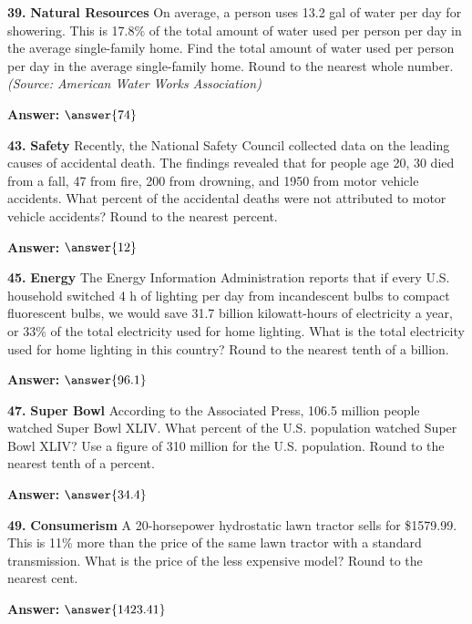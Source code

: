 \documentclass{ximera}
\begin{document}
\begin{problem}
\textbf{39.} \textbf{Natural Resources} On average, a person uses 13.2 gal of water per day
  for showering. This is 17.8\% of the total amount of water used per person per day in
  the average single-family home. Find the total amount of water used per person per
  day in the average single-family home. Round to the nearest whole number.
  \emph{(Source: American Water Works Association)}

\textbf{Answer:} $\answer{74}$
\end{problem}

\begin{problem}
\textbf{43.} \textbf{Safety} Recently, the National Safety Council collected data on the
  leading causes of accidental death. The findings revealed that for people age 20,
  30 died from a fall, 47 from fire, 200 from drowning, and 1950 from motor vehicle
  accidents. What percent of the accidental deaths were not attributed to motor vehicle
  accidents? Round to the nearest percent.

\textbf{Answer:} $\answer{12}$
\end{problem}

\begin{problem}
\textbf{45.} \textbf{Energy} The Energy Information Administration reports that if every U.S.
  household switched 4 h of lighting per day from incandescent bulbs to compact
  fluorescent bulbs, we would save 31.7 billion kilowatt-hours of electricity a year,
  or 33\% of the total electricity used for home lighting. What is the total electricity
  used for home lighting in this country? Round to the nearest tenth of a billion.

\textbf{Answer:} $\answer{96.1}$
\end{problem}

\begin{problem}
\textbf{47.} \textbf{Super Bowl} According to the Associated Press, 106.5 million people
  watched Super Bowl XLIV. What percent of the U.S. population watched Super Bowl XLIV?
  Use a figure of 310 million for the U.S. population. Round to the nearest tenth of a
  percent.

\textbf{Answer:} $\answer{34.4}$
\end{problem}

\begin{problem}
\textbf{49.} \textbf{Consumerism} A 20-horsepower hydrostatic lawn tractor sells for
  \$1579.99. This is 11\% more than the price of the same lawn tractor with a standard
  transmission. What is the price of the less expensive model? Round to the nearest
  cent.

\textbf{Answer:} $\answer{1423.41}$
\end{problem}
\end{document}
